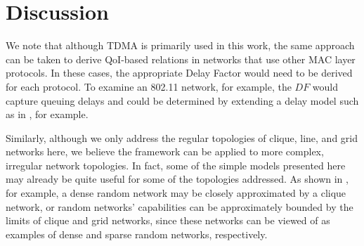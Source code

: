 \section{Discussion}
\label{sec:discussion}


We note that although TDMA is primarily used in this work, the same approach can be taken to derive QoI-based relations in networks that use other MAC layer protocols.  In these cases, the appropriate Delay Factor would need to be derived for each protocol.  To examine an 802.11 network, for example, the $DF$ would capture queuing delays and could be determined by extending a delay model such as in \cite{perf_anal_80211_lan_mac}, for example.  

Similarly, although we only address the regular topologies of clique, line, and grid networks here, we believe the framework can be applied to more complex, irregular network topologies.  In fact, some of the simple models presented here may already be quite useful for some of the topologies addressed.  As shown in \cite{symptotics_tech_report}, for example, a dense random network may be closely approximated by a clique network, or random networks' capabilities can be approximately bounded by the limits of clique and grid networks, since these networks can be viewed of as examples of dense and sparse random networks, respectively.  


